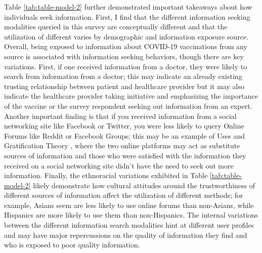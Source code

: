 Table \ref{tab:table-model-2} further demonstrated important takeaways about
how individuals seek information. First, I find that the different information
seeking modalities queried in this survey are conceptually different and that the
utilization of different varies by demographic and information exposure source. 
Overall, being exposed to information about COVID-19 vaccinations from any 
source is associated with information seeking behaviors,
though there are key variations. First, if one received information from a
doctor, they were likely to search from information from a doctor; this may
indicate an already existing trusting relationship between patient and
healthcare provider but it may also indicate the healthcare provider taking
initiative and emphasizing the importance of the vaccine or the survey respondent
seeking out information from an expert. Another important finding is that if you
received information from a social networking site like Facebook or Twitter, you
were less likely to query Online Forums like Reddit or Facebook Groups; this may
be an example of Uses and Gratification Theory
\citep{blumlerUsesMassCommunications1974}, where the two online platforms may act as
substitute sources of information and those who were satisfied with the
information they received on a social networking site didn't have the need to
seek out more information. Finally, the ethnoracial variations exhibited in
Table \ref{tab:table-model-2} likely demonstrate how cultural attitudes around
the trustworthiness of different sources of information affect the utilization
of different methods; for example, Asians seem are less likely to use online
forums than non-Asians, while Hispanics are more likely to use them than
non-Hispanics. The internal variations between the different information search
modalities hint at different user profiles and may have major repercussions on the
quality of information they find and who is exposed to poor quality information.

